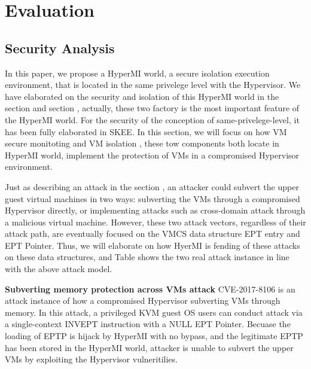 \documentclass[conference]{IEEEtran}
\begin{document}
\section{Evaluation}
\subsection{Security Analysis}
In this paper, we propose a HyperMI world, a secure isolation execution environment, that is located in the same privelege level with the Hypervisor. We have elaborated on the security and isolation of this HyperMI world in the section \cite{} and section \cite{}, actually, these two factory is the most important feature of the HyperMI world. For the security of the conception of same-privelege-level, it has been fully elaborated in SKEE. 
In this section, we will focus on how VM secure monitoting and VM isolation %
, these tow components both locate in HyperMI world, implement the protection of VMs in a compromised Hypervisor environment. 

Just as describing an attack in the section \cite{}
, an attacker could subvert the upper guest virtual machines in two ways: subverting the VMs through a compromised Hypervisor directly, or implementing attacks such as cross-domain attack through a malicious virtual machine.  However, these two attack vectors, regardless of their attack path, are eventually focused on the VMCS data structure EPT entry and EPT Pointer. Thus, we will elaborate on how HyerMI is fending of these attacks on these data structures, and Table \cite{tab3} shows the two real attack instance in line with the above attack model. 

\textbf{Subverting memory protection across VMs attack}
CVE-2017-8106 is an attack instance of how a compromised Hypervisor subverting VMs through memory. In this attack, a privileged KVM guest OS users can conduct attack via a single-context INVEPT instruction with a NULL EPT Pointer. Becuase the loading of  EPTP is hijack by HyperMI with no bypass, and the legitimate EPTP has been stored in the HyperMI world, attacker is unable to subvert the upper VMs by exploiting the Hypervisor vulneritilies. 
\end{document}

